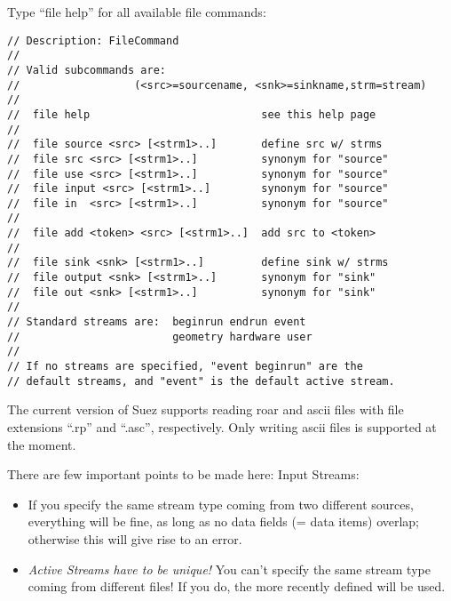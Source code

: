 \documentclass[12pt]{article}
\begin{document}
\medskip
Type ``file help'' for all available file commands:
%
\begin{verbatim}
// Description: FileCommand                                       
//                                                                
// Valid subcommands are:                                         
//                  (<src>=sourcename, <snk>=sinkname,strm=stream)
//                                                                
//  file help                           see this help page        
//                                                                
//  file source <src> [<strm1>..]       define src w/ strms       
//  file src <src> [<strm1>..]          synonym for "source"    
//  file use <src> [<strm1>..]          synonym for "source"    
//  file input <src> [<strm1>..]        synonym for "source"    
//  file in  <src> [<strm1>..]          synonym for "source"    
//                                                                
//  file add <token> <src> [<strm1>..]  add src to <token>        
//                                                                
//  file sink <snk> [<strm1>..]         define sink w/ strms      
//  file output <snk> [<strm1>..]       synonym for "sink"      
//  file out <snk> [<strm1>..]          synonym for "sink"     
// 
// Standard streams are:  beginrun endrun event              
//                        geometry hardware user             
//                                                           
// If no streams are specified, "event beginrun" are the   
// default streams, and "event" is the default active stream.
\end{verbatim}

The current version of Suez supports reading roar and ascii files with
file extensions ``.rp'' and ``.asc'', respectively.
Only writing ascii files is supported at the moment.

There are few important points to be made here:
%
Input Streams:
\begin{itemize}

\item If you specify the same stream type coming from two different
sources, everything will be fine, as long as no data fields (= data
items) overlap; otherwise this will give rise to an error.

\item \emph{Active Streams have to be unique!} You can't specify the
same stream type coming from different files! If you do, the more
recently defined will be used.

\end{itemize}
\end{document}
